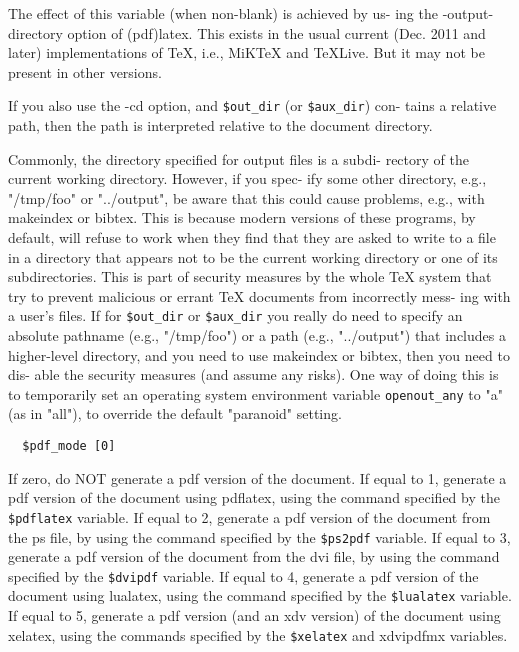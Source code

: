The  effect of this variable (when non-blank) is achieved by us-
ing the -output-directory option of (pdf)latex.  This exists  in
the  usual current (Dec. 2011 and later) implementations of TeX,
i.e., MiKTeX and TeXLive. But it may not  be  present  in  other
versions.

If  you also use the -cd option, and \verb|$out_dir| (or \verb|$aux_dir|) con-
tains a relative path, then the path is interpreted relative  to
the document directory.

Commonly,  the  directory specified for output files is a subdi-
rectory of the current working directory.  However, if you spec-
ify  some  other  directory, e.g., "/tmp/foo" or "../output", be
aware that this could cause problems, e.g.,  with  makeindex  or
bibtex.   This  is because modern versions of these programs, by
default, will refuse to work when they find that they are  asked
to  write  to  a  file in a directory that appears not to be the
current working directory or one of its subdirectories.  This is
part  of  security  measures by the whole TeX system that try to
prevent malicious or errant TeX documents from incorrectly mess-
ing with a user's files.  If for \verb|$out_dir| or \verb|$aux_dir| you really
do need to specify an absolute pathname (e.g., "/tmp/foo") or  a
path (e.g., "../output") that includes a higher-level directory,
and you need to use makeindex or bibtex, then you need  to  dis-
able  the  security measures (and assume any risks).  One way of doing this is
to temporarily set an operating system environment variable  \verb|openout_any|
to "a" (as in "all"), to override the default "paranoid" setting.

\begin{verbatim}
  $pdf_mode [0]
\end{verbatim}

If zero, do NOT generate a pdf  version  of  the  document.   If equal  to 1,
generate a pdf version of the document using pdflatex, using the command
specified by the \verb|$pdflatex| variable.   If equal  to  2, generate a pdf
version of the document from the ps file, by using the command specified by
the  \verb|$ps2pdf|  variable.  If  equal  to 3, generate a pdf version of the
document from the dvi file, by using the command specified by  the
\verb|$dvipdf|  variable.  If equal to 4, generate a pdf version of the
document using lualatex, using the command specified by the \verb|$lualatex|
variable.   If  equal  to 5, generate a pdf version (and an xdv version) of the
document using xelatex, using the  commands  specified by the \verb|$xelatex|
and xdvipdfmx variables.

